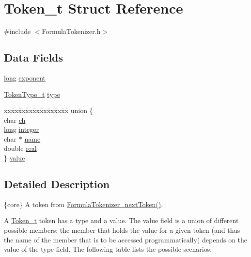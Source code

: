 \hypertarget{struct_token__t}{}\section{Token\+\_\+t Struct Reference}
\label{struct_token__t}


{\ttfamily \#include $<$Formula\+Tokenizer.\+h$>$}

\subsection*{Data Fields}
\begin{DoxyCompactItemize}
\item 
\hyperlink{lp__lib_8h_ad3500e0f98a49bb08992451a297ce6a6}{long} \hyperlink{struct_token__t_a33321cc49d845e5502511b1e5b3ab7a5}{exponent}
\item 
\hyperlink{_formula_tokenizer_8h_abf84b8f73da30c0f59581856a399081c}{Token\+Type\+\_\+t} \hyperlink{struct_token__t_ad49347edf094f6ea46bb0bf53ba05845}{type}
\item 
\begin{tabbing}
xx\=xx\=xx\=xx\=xx\=xx\=xx\=xx\=xx\=\kill
union \{\\
\>char \hyperlink{struct_token__t_a2bf1151f115447de0e40732b00e84e73}{ch}\\
\>\hyperlink{lp__lib_8h_ad3500e0f98a49bb08992451a297ce6a6}{long} \hyperlink{struct_token__t_abea646fe4ec1c61ea6acfddb790e098b}{integer}\\
\>char $\ast$ \hyperlink{struct_token__t_af809303f4d62262f2f5470022be688d8}{name}\\
\>double \hyperlink{struct_token__t_a17b735b0baa2d43fd6088d31a770f7b1}{real}\\
\} \hyperlink{struct_token__t_ad723e275a50a96f45017704383a67c5f}{value}\\

\end{tabbing}\end{DoxyCompactItemize}


\subsection{Detailed Description}
\{core\} A token from \hyperlink{_formula_tokenizer_8h_a85f75f0f003ba89ae22163cef7dacb1d}{Formula\+Tokenizer\+\_\+next\+Token()}.

A \hyperlink{struct_token__t}{Token\+\_\+t} token has a {\ttfamily type} and a {\ttfamily value}. The {\ttfamily value} field is a union of different possible members; the member that holds the value for a given token (and thus the name of the member that is to be accessed programmatically) depends on the value of the {\ttfamily type} field. The following table lists the possible scenarios\+:

